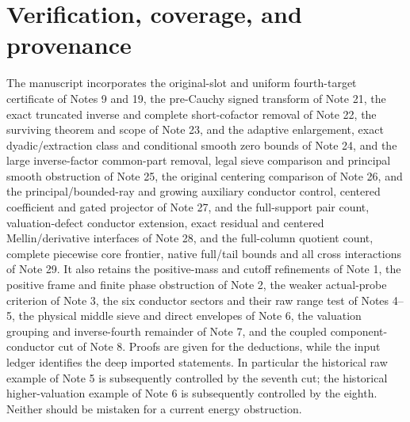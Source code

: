 \documentclass[11pt]{article}
\theoremstyle{definition}
\begin{document}
\section{Verification, coverage, and provenance}\label{app-verification}
The manuscript incorporates the original-slot and uniform fourth-target certificate of Notes 9 and 19, the pre-Cauchy signed transform of Note 21, the exact truncated inverse and complete short-cofactor removal of Note 22, the surviving theorem and scope of Note 23, and the adaptive enlargement, exact dyadic/extraction class and conditional smooth zero bounds of Note 24, and the large inverse-factor common-part removal, legal sieve comparison and principal smooth obstruction of Note 25, the original centering comparison of Note 26, and the principal/bounded-ray and growing auxiliary conductor control, centered coefficient and gated projector of Note 27, and the full-support pair count, valuation-defect conductor extension, exact residual and centered Mellin/derivative interfaces of Note 28, and the full-column quotient count, complete piecewise core frontier, native full/tail bounds and all cross interactions of Note 29. It also retains the positive-mass and cutoff refinements of Note 1, the positive frame and finite phase obstruction of Note 2, the weaker actual-probe criterion of Note 3, the six conductor sectors and their raw range test of Notes 4--5, the physical middle sieve and direct envelopes of Note 6, the valuation grouping and inverse-fourth remainder of Note 7, and the coupled component-conductor cut of Note 8. Proofs are given for the deductions, while the input ledger identifies the deep imported statements. In particular the historical raw example of Note 5 is subsequently controlled by the seventh cut; the historical higher-valuation example of Note 6 is subsequently controlled by the eighth. Neither should be mistaken for a current energy obstruction.
\end{document}
